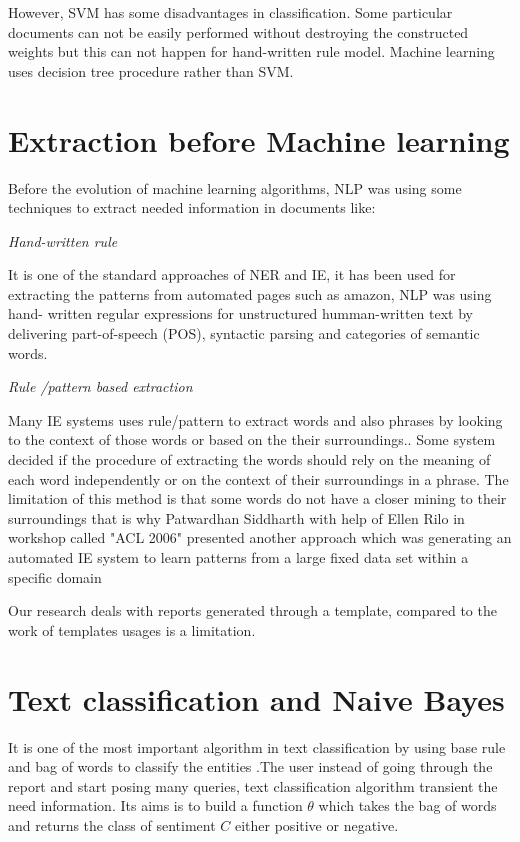 However, SVM has some disadvantages in classification. Some particular documents can not be  easily performed without destroying the constructed weights  but this can not happen for  hand-written rule model. Machine learning uses decision tree procedure rather than  SVM.

\section{Extraction before Machine learning}
Before the evolution of machine learning algorithms, NLP was using some  techniques to extract needed information in documents like:

\textit{Hand-written rule}

It is one of the standard approaches of NER and IE, it has been used for extracting the patterns from automated pages such as amazon, NLP was using hand- written regular expressions for unstructured humman-written text by delivering  part-of-speech (POS), syntactic parsing and categories of semantic words.

\textit{Rule /pattern based extraction}

Many IE systems uses rule/pattern to extract words and also phrases by looking to the context of those words or based on the their surroundings.\citep{califf2003bottom}. Some system decided if the procedure of extracting the words should rely on the meaning of each word independently or on the context of their surroundings in a phrase.
The limitation of this method is that some words do not have a closer mining to their surroundings that is why Patwardhan Siddharth with help of Ellen Rilo  in workshop called "ACL 2006" presented another approach which  was  generating an automated IE system to learn patterns from a large fixed data set  within a specific domain \citep{patwardhan2007effective} 

Our research deals with reports generated through a template, compared to the work of  \citep{patwardhan2007effective} templates usages is a limitation.

\section{Text classification and Naive Bayes}


It is one of the most important algorithm in text classification by using base rule and bag of words to classify the entities \citep{manning2012information}.The user instead of going through the report and start posing many queries, text classification algorithm transient the need information.
Its aims is to build a function $\theta$ which takes the bag of words and returns the class of sentiment $C$ either positive or negative.
 
